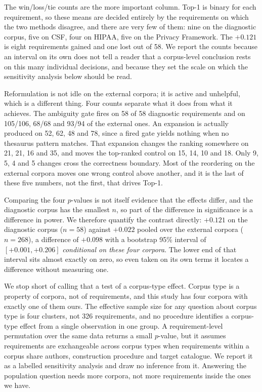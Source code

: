 \documentclass[a4paper,fleqn]{cas-sc}
\begin{document}
The win/loss/tie counts are the more important column. Top-1 is binary for each requirement, so these means are decided entirely by the requirements on which the two methods disagree, and there are very few of them: nine on the diagnostic corpus, five on CSF, four on HIPAA, five on the Privacy Framework. The $+0.121$ is eight requirements gained and one lost out of 58. We report the counts because an interval on its own does not tell a reader that a corpus-level conclusion rests on this many individual decisions, and because they set the scale on which the sensitivity analysis below should be read.

Reformulation is not idle on the external corpora; it is active and unhelpful, which is a different thing. Four counts separate what it does from what it achieves. The ambiguity gate fires on 58 of 58 diagnostic requirements and on 105/106, 68/68 and 93/94 of the external ones. An expansion is actually produced on 52, 62, 48 and 78, since a fired gate yields nothing when no thesaurus pattern matches. That expansion changes the ranking somewhere on 21, 21, 16 and 35, and moves the top-ranked control on 15, 14, 10 and 18. Only 9, 5, 4 and 5 changes cross the correctness boundary. Most of the reordering on the external corpora moves one wrong control above another, and it is the last of these five numbers, not the first, that drives Top-1.

Comparing the four $p$-values is not itself evidence that the effects differ, and the diagnostic corpus has the smallest $n$, so part of the difference in significance is a difference in power. We therefore quantify the contrast directly: $+0.121$ on the diagnostic corpus ($n = 58$) against $+0.022$ pooled over the external corpora ($n = 268$), a difference of $+0.098$ with a bootstrap 95\% interval of $[+0.001, +0.206]$ \emph{conditional on these four corpora}. The lower end of that interval sits almost exactly on zero, so even taken on its own terms it locates a difference without measuring one.

We stop short of calling that a test of a corpus-type effect. Corpus type is a property of corpora, not of requirements, and this study has four corpora with exactly one of them ours. The effective sample size for any question about corpus type is four clusters, not 326 requirements, and no procedure identifies a corpus-type effect from a single observation in one group. A requirement-level permutation over the same data returns a small $p$-value, but it assumes requirements are exchangeable across corpus types when requirements within a corpus share authors, construction procedure and target catalogue. We report it as a labelled sensitivity analysis and draw no inference from it. Answering the population question needs more corpora, not more requirements inside the ones we have.
\end{document}
